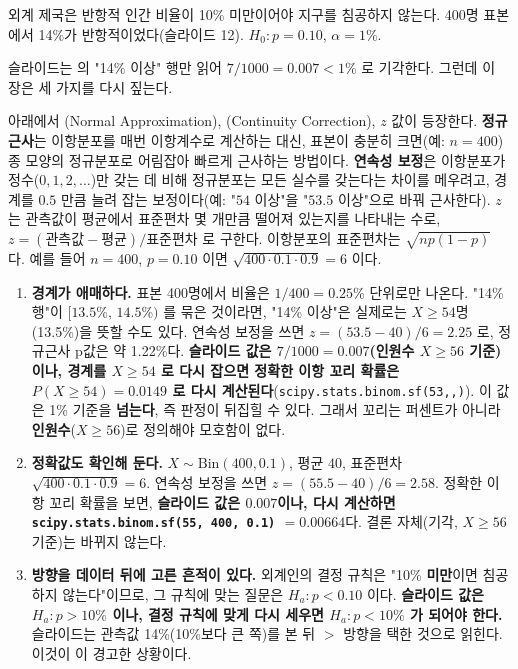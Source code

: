 \begin{pitfall}
\label{pit:ht-alien}
외계 제국은 반항적 인간 비율이 10\% 미만이어야 지구를 침공하지 않는다.
400명 표본에서 14\%가 반항적이었다(슬라이드 12). $H_0: p = 0.10$,
$\alpha = 1\%$.

슬라이드는 의 "14\% 이상" 행만 읽어
$7/1000 = 0.007 < 1\%$ 로 기각한다. 그런데 이 장은 세 가지를 다시 짚는다.

아래에서 (Normal Approximation), 
(Continuity Correction), $z$ 값이 등장한다. \textbf{정규근사}는 이항분포를
매번 이항계수로 계산하는 대신, 표본이 충분히 크면(예: $n=400$) 종 모양의
정규분포로 어림잡아 빠르게 근사하는 방법이다. \textbf{연속성 보정}은
이항분포가 정수($0, 1, 2, \dots$)만 갖는 데 비해 정규분포는 모든 실수를
갖는다는 차이를 메우려고, 경계를 $0.5$ 만큼 늘려 잡는 보정이다(예: "$54$
이상"을 "$53.5$ 이상"으로 바꿔 근사한다). $z$ 는 관측값이 평균에서
표준편차 몇 개만큼 떨어져 있는지를 나타내는 수로, $z = (\text{관측값} -
\text{평균})/\text{표준편차}$ 로 구한다. 이항분포의 표준편차는
$\sqrt{np(1-p)}$ 다. 예를 들어 $n=400$, $p=0.10$ 이면
$\sqrt{400 \cdot 0.1 \cdot 0.9} = 6$ 이다.

\begin{enumerate}
  \item \textbf{경계가 애매하다.} 표본 400명에서 비율은 $1/400 = 0.25\%$
        단위로만 나온다. "14\% 행"이 $[13.5\%,\,14.5\%)$ 를 묶은 것이라면,
        "14\% 이상"은 실제로는 $X \ge 54$명(13.5\%)을 뜻할 수도 있다. 연속성
        보정을 쓰면 $z = (53.5-40)/6 = 2.25$ 로, 정규근사 p값은 약
        1.22\%다.
        \textbf{슬라이드 값은 $7/1000 = 0.007$(인원수 $X \ge 56$ 기준)이나,
        경계를 $X \ge 54$ 로 다시 잡으면 정확한 이항 꼬리 확률은
        $P(X \ge 54) = 0.0149$ 로 다시 계산된다}(\texttt{scipy.stats.binom.sf(53,,)}). 이 값은 1\% 기준을 \textbf{넘는다}, 즉
        판정이 뒤집힐 수 있다. 그래서 꼬리는 퍼센트가 아니라
        \textbf{인원수}($X \ge 56$)로 정의해야 모호함이 없다.
  \item \textbf{정확값도 확인해 둔다.} $X \sim \mathrm{Bin}(400, 0.1)$,
        평균 $40$, 표준편차 $\sqrt{400 \cdot 0.1 \cdot 0.9} = 6$. 연속성
        보정을 쓰면 $z = (55.5-40)/6 = 2.58$. 정확한 이항 꼬리 확률을
        보면, \textbf{슬라이드 값은 $0.007$이나, 다시 계산하면
        \texttt{scipy.stats.binom.sf(55, 400, 0.1)} $= 0.00664$}다. 결론
        자체(기각, $X\ge56$ 기준)는 바뀌지 않는다.
  \item \textbf{방향을 데이터 뒤에 고른 흔적이 있다.} 외계인의 결정 규칙은
        "10\% \textbf{미만}이면 침공하지 않는다"이므로, 그 규칙에 맞는
        질문은 $H_a: p < 0.10$ 이다. \textbf{슬라이드 값은 $H_a: p > 10\%$
        이나, 결정 규칙에 맞게 다시 세우면 $H_a: p < 10\%$ 가 되어야
        한다.} 슬라이드는 관측값 14\%(10\%보다 큰 쪽)를 본 뒤 $>$ 방향을
        택한 것으로 읽힌다. 이것이 이 경고한
        상황이다.
\end{enumerate}


\end{pitfall}
